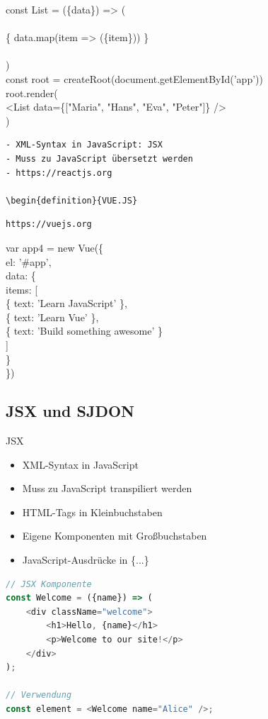 const List = (\{data\}) => (\\
\\
\{ data.map(item => (\{item\})) \}\\
\\
)\\
const root = createRoot(document.getElementById('app'))\\
root.render(\\[0pt]
<List data=\{["Maria", "Hans", "Eva", "Peter"]\} />\\
)

\begin{verbatim}
- XML-Syntax in JavaScript: JSX
- Muss zu JavaScript übersetzt werden
- https://reactjs.org

\begin{definition}{VUE.JS}
\end{verbatim}

\begin{verbatim}
https://vuejs.org
\end{verbatim}

var app4 = new Vue(\{\\
el: '\#app',\\
data: \{\\
items: [\\
\{ text: 'Learn JavaScript' \},\\
\{ text: 'Learn Vue' \},\\
\{ text: 'Build something awesome' \}\\[0pt]
]\\
\}\\
\})

\columnbreak

\subsection{JSX und SJDON}

\begin{definition}{JSX}
    \begin{itemize}
        \item XML-Syntax in JavaScript
        \item Muss zu JavaScript transpiliert werden
        \item HTML-Tags in Kleinbuchstaben
        \item Eigene Komponenten mit Großbuchstaben
        \item JavaScript-Ausdrücke in \{...\}
    \end{itemize}
\begin{lstlisting}[language=JavaScript, style=basesmol]
// JSX Komponente
const Welcome = ({name}) => (
    <div className="welcome">
        <h1>Hello, {name}</h1>
        <p>Welcome to our site!</p>
    </div>
);

// Verwendung
const element = <Welcome name="Alice" />;
\end{lstlisting}
\end{definition}

